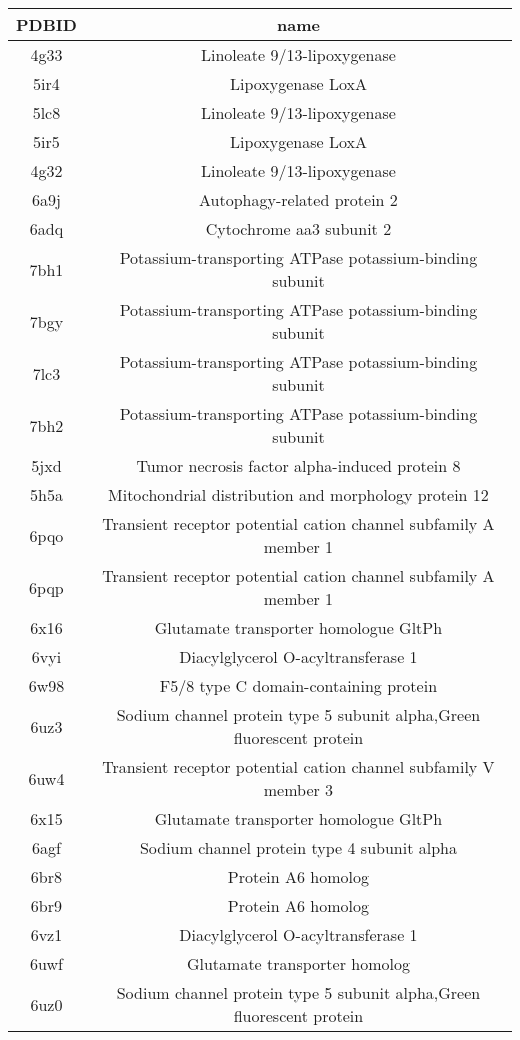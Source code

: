 \documentclass{article}
\begin{document}
\begin{table}[]
    \centering
    \begin{tabular}{c|c}
PDBID & name \\
\hline
4g33 & Linoleate 9/13-lipoxygenase \\ 
5ir4 & Lipoxygenase LoxA \\ 
5lc8 & Linoleate 9/13-lipoxygenase \\ 
5ir5 & Lipoxygenase LoxA \\ 
4g32 & Linoleate 9/13-lipoxygenase \\ 
6a9j & Autophagy-related protein 2 \\ 
6adq & Cytochrome aa3 subunit 2 \\ 
7bh1 & Potassium-transporting ATPase potassium-binding subunit \\ 
7bgy & Potassium-transporting ATPase potassium-binding subunit \\ 
7lc3 & Potassium-transporting ATPase potassium-binding subunit \\ 
7bh2 & Potassium-transporting ATPase potassium-binding subunit \\ 
5jxd & Tumor necrosis factor alpha-induced protein 8 \\ 
5h5a & Mitochondrial distribution and morphology protein 12 \\ 
6pqo & Transient receptor potential cation channel subfamily A member 1 \\ 
6pqp & Transient receptor potential cation channel subfamily A member 1 \\ 
6x16 & Glutamate transporter homologue GltPh \\ 
6vyi & Diacylglycerol O-acyltransferase 1 \\ 
6w98 & F5/8 type C domain-containing protein \\ 
6uz3 & Sodium channel protein type 5 subunit alpha,Green fluorescent protein \\ 
6uw4 & Transient receptor potential cation channel subfamily V member 3 \\ 
6x15 & Glutamate transporter homologue GltPh \\ 
6agf & Sodium channel protein type 4 subunit alpha \\ 
6br8 & Protein A6 homolog \\ 
6br9 & Protein A6 homolog \\ 
6vz1 & Diacylglycerol O-acyltransferase 1 \\ 
6uwf & Glutamate transporter homolog \\ 
6uz0 & Sodium channel protein type 5 subunit alpha,Green fluorescent protein \\ 

\end{tabular}
\end{table}
\end{document}
